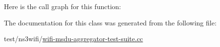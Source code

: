 Here is the call graph for this function\+:




The documentation for this class was generated from the following file\+:\begin{DoxyCompactItemize}
\item 
test/ns3wifi/\hyperlink{wifi-msdu-aggregator-test-suite_8cc}{wifi-\/msdu-\/aggregator-\/test-\/suite.\+cc}\end{DoxyCompactItemize}
